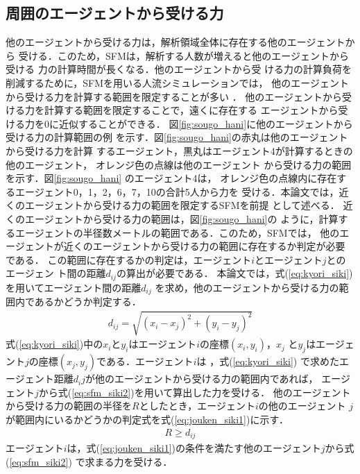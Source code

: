 \subsection{周囲のエージェントから受ける力}
他のエージェントから受ける力は，解析領域全体に存在する他のエージェントから
受ける．このため，SFMは，解析する人数が増えると他のエージェントから受ける
力の計算時間が長くなる．他のエージェントから受
ける力の計算負荷を削減するために，SFMを用いる人流シミュレーションでは，
他のエージェントから受ける力を計算する範囲を限定することが多い
\cite{seru_sfm1}\cite{seru_sfm2}．
他のエージェントから受ける力を計算する範囲を限定することで，遠くに存在する
エージェントから受ける力を0に近似することができる．
図\ref{fig:sougo_hani}に他のエージェントから受ける力の計算範囲の例
を示す．図\ref{fig:sougo_hani}の赤丸は他のエージェントから受ける力を計算
するエージェント，黒丸はエージェント4が計算するときの他のエージェント，
オレンジ色の点線は他のエージェント
から受ける力の範囲を示す．図\ref{fig:sougo_hani} のエージェント4は，
オレンジ色の点線内に存在するエージェント0，1，2，6，7，10の合計5人から力を
受ける．本論文では，近くのエージェントから受ける力の範囲を限定するSFMを前提
として述べる．
近くのエージェントから受ける力の範囲は，図\ref{fig:sougo_hani}の
ように，計算するエージェントの半径数メートルの範囲である．このため，SFMでは，
他のエージェントが近くのエージェントから受ける力の範囲に存在するか判定が必要
である．
この範囲に存在するかの判定は，エージェント$i$とエージェント$j$とのエージェン
ト間の距離$d_{ij}$の算出が必要である．
本論文では，式(\ref{eq:kyori_siki})を用いてエージェント間の距離$d_{ij}$
を求め，他のエージェントから受ける力の範囲内であるかどうか判定する．
%
\begin{eqnarray}
　d_{ij} =  \sqrt{ (x_i-x_j)^2 + (y_i-y_j)^2 }
 \label{eq:kyori_siki}
\end{eqnarray}
%
式(\ref{eq:kyori_siki})中の$x_i$と$y_i$はエージェント$i$の座標$(x_i,y_i)$，$x_j$
と$y_j$はエージェント$j$の座標$(x_j,y_j)$である．エージェント$i$は
，式(\ref{eq:kyori_siki})
で求めたエージェント距離$d_ij$が他のエージェントから受ける力の範囲内であれば，
エージェント$j$から式(\ref{eq:sfm_siki2})を用いて算出した力を受ける．
他のエージェントから受ける力の範囲の半径を$R$としたとき，エージェント$i$の他のエージェント
$j$が範囲内にいるかどうかの判定式を式(\ref{eq:jouken_siki1})に示す．
%
\begin{eqnarray}
  \label{eq:jouken_siki1}
  R \geq d_{ij}
\end{eqnarray}
%
エージェント$i$は，式(\ref{eq:jouken_siki1})の条件を満たす他のエージェント$j$から式(\ref{eq:sfm_siki2})
で求まる力を受ける．


